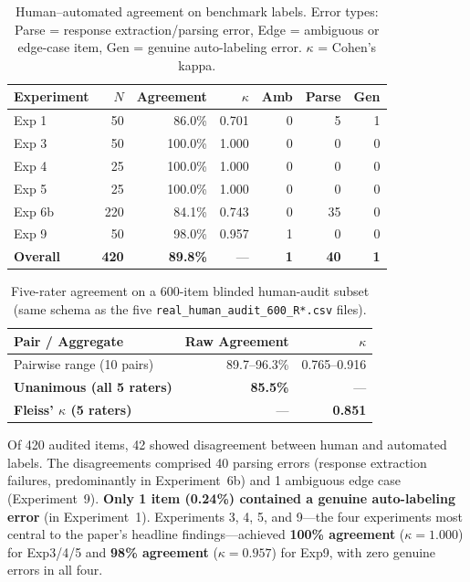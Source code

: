 \documentclass[10pt]{article}
\begin{document}
\begin{table}[h]
\centering
\caption{Human--automated agreement on benchmark labels. Error types:
  Parse = response extraction/parsing error, Edge = ambiguous or edge-case item,
  Gen = genuine auto-labeling error. $\kappa$ = Cohen's kappa.}
\label{tab:human-audit}
\small
\begin{tabular}{lrrrrrr}
\toprule
Experiment & $N$ & Agreement & $\kappa$ & Amb & Parse & Gen \\
\midrule
Exp 1 & 50 & 86.0\% & 0.701 & 0 & 5 & 1 \\
Exp 3 & 50 & 100.0\% & 1.000 & 0 & 0 & 0 \\
Exp 4 & 25 & 100.0\% & 1.000 & 0 & 0 & 0 \\
Exp 5 & 25 & 100.0\% & 1.000 & 0 & 0 & 0 \\
Exp 6b & 220 & 84.1\% & 0.743 & 0 & 35 & 0 \\
Exp 9 & 50 & 98.0\% & 0.957 & 1 & 0 & 0 \\
\midrule
\textbf{Overall} & \textbf{420} & \textbf{89.8\%} & --- & \textbf{1} & \textbf{40} & \textbf{1} \\
\bottomrule
\end{tabular}
\end{table}

\begin{table}[h]
\centering
\caption{Five-rater agreement on a 600-item blinded human-audit subset
  (same schema as the five \texttt{real\_human\_audit\_600\_R*.csv} files).}
\label{tab:human-audit-multirater}
\small
\begin{tabular}{lrr}
\toprule
Pair / Aggregate & Raw Agreement & $\kappa$ \\
\midrule
Pairwise range (10 pairs) & 89.7--96.3\% & 0.765--0.916 \\
\midrule
\textbf{Unanimous (all 5 raters)} & \textbf{85.5\%} & --- \\
\textbf{Fleiss' $\kappa$ (5 raters)} & --- & \textbf{0.851} \\
\bottomrule
\end{tabular}
\end{table}

Of 420 audited items, 42 showed disagreement between human and automated labels.
The disagreements comprised 40 parsing errors (response extraction failures, predominantly in Experiment~6b) and 1 ambiguous edge case (Experiment~9). \textbf{Only 1 item (0.24\%) contained a genuine auto-labeling error} (in Experiment~1).
Experiments 3, 4, 5, and 9---the four experiments most central to the paper's headline findings---achieved \textbf{100\% agreement} ($\kappa = 1.000$) for Exp3/4/5 and \textbf{98\% agreement} ($\kappa = 0.957$) for Exp9, with zero genuine errors in all four.
\end{document}
